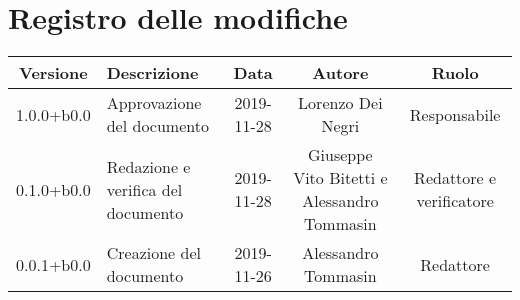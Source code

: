 \section*{Registro delle modifiche}

\begin{center}
	\begin{longtable}{|c|p{3cm}|c|c|c|}
	\hline
	\rowcolor{lighter-grayer}
	\textbf{Versione} & \textbf{Descrizione} & \textbf{Data} & \textbf{Autore} & \textbf{Ruolo} \\
	\hline
	\endfirsthead


	1.0.0+b0.0 & Approvazione del documento & 2019-11-28 & Lorenzo Dei Negri & Responsabile \\
	\hline
	0.1.0+b0.0 & Redazione e verifica del documento & 2019-11-28 & Giuseppe Vito Bitetti e Alessandro Tommasin & Redattore e verificatore \\
	\hline
	0.0.1+b0.0 & Creazione del documento & 2019-11-26 & Alessandro Tommasin & Redattore \\
	\hline

	\end{longtable}
\end{center}
